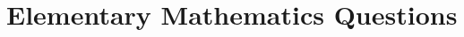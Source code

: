 \documentclass[12pt]{article}
\begin{document}
\section*{Elementary Mathematics Questions}

\end{document}
